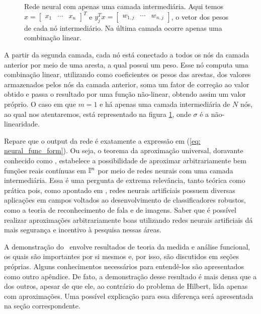 \begin{figure}[h]
    \begin{center}
        
    \end{center}
    \caption{Rede neural com apenas uma camada intermediária.
    Aqui temos \( x =
    \begin{bmatrix}
        x_{ 1 } & \cdots & x_{ n }
    \end{bmatrix}^{ T } \) e \( y_{ j }^{ T }x =
    \begin{bmatrix}
        w_{ 1,j } & \cdots & w_{ n,j }
    \end{bmatrix} \), o vetor dos pesos de cada nó intermediário.
    Na última camada ocorre apenas uma combinação linear.}
    \label{fig: neural_net}
\end{figure}

A partir da segunda camada, cada nó está conectado a todos os nós da camada anterior por meio de uma aresta, a qual possui um peso.
Esse nó computa uma combinação linear, utilizando como coeficientes os pesos das arestas, dos valores armazenados pelos nós da camada anterior, soma um fator de correção ao valor obtido e passa o resultado por uma função não-linear, obtendo assim um valor próprio.
O caso em que \( m = 1 \) e há apenas uma camada intermediária de \( N \) nós, ao qual nos atentaremos, está representado na figura \ref{fig: neural_net}, onde \( \sigma \) é a não-linearidade.


Repare que o output da rede é exatamente a expressão em (\ref{eq: neural_func_form}).
Ou seja, o teorema da aproximação universal, doravante conhecido como \uat , estabelece a possibilidade de aproximar arbitrariamente bem funções reais contínuas em \( \mathbb{I}^{ n } \) por meio de redes neurais com uma camada intermediária.
Essa é uma pergunta de extrema relevância, tanto teórica como prática pois, como apontado em \cite{lipmann}, redes neurais artificiais possuem diversas aplicações em campos voltados ao desenvolvimento de classificadores robustos, como a teoria de reconhecimento de fala e de imagens.
Saber que é possível realizar aproximações arbitrariamente boas utilizando redes neurais artificiais dá mais segurança e incentivo à pesquisa nessas áreas.

A demonstração do \uat \ envolve resultados de teoria da medida e análise funcional, os quais são importantes por si mesmos e, por isso, são discutidos em seções próprias.
Alguns conhecimentos necessários para entendê-los são apresentados como outro apêndice.
De fato, a demonstração desse resultado é mais densa que a dos outros, apesar de que ele, ao contrário do problema de Hilbert, lida apenas com aproximações.
Uma possível explicação para essa diferença será apresentada na seção correspondente.

